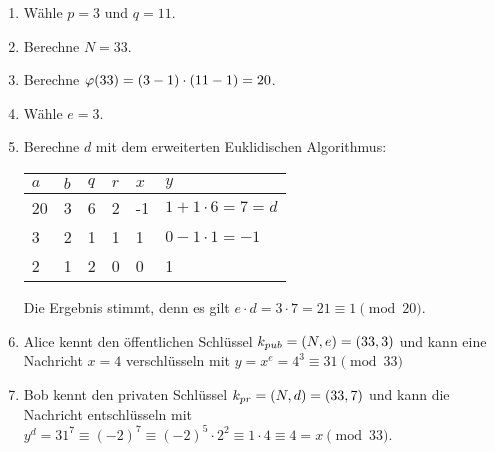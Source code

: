 \begin{example}\mbox{}
  \begin{enumerate}
    \item Wähle $p = 3$ und $q = 11$.
    \item Berechne $N = 33$.
    \item Berechne $\varphi(33) = (3 - 1) \cdot (11 - 1) = 20$.
    \item Wähle $e = 3$.
    \item Berechne $d$ mit dem erweiterten Euklidischen Algorithmus:
          \begin{center}
            \begin{tabular}{|l|l|l|l|l|l|}
              \hline
              $a$ & $b$ & $q$ & $r$ & $x$ & $y$                     \\ \hline
              20  & 3   & 6   & 2   & -1  & $1 + 1 \cdot 6 = 7 = d$ \\ \hline
              3   & 2   & 1   & 1   & 1   & $0 - 1 \cdot 1 = -1$    \\ \hline
              2   & 1   & 2   & 0   & 0   & 1                       \\ \hline
            \end{tabular}
          \end{center}
          Die Ergebnis stimmt, denn es gilt $e \cdot d = 3 \cdot 7 = 21 \equiv 1 \pmod{20}$.
    \item Alice kennt den öffentlichen Schlüssel $k_{pub} = (N,e) = (33,3)$ und kann eine
          Nachricht $x = 4$ verschlüsseln mit $y = x^e = 4^3 \equiv 31 \pmod{33}$
    \item Bob kennt den privaten Schlüssel $k_{pr} = (N,d) = (33,7)$ und kann die Nachricht
          entschlüsseln mit $y^d = 31^7 \equiv (-2)^7 \equiv (-2)^5 \cdot 2^2 \equiv
            1 \cdot 4 \equiv 4 = x \pmod{33}$. \qedhere
  \end{enumerate}
\end{example}